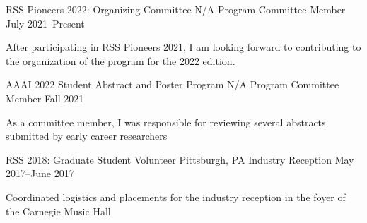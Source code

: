 
\begin{cventries}
  \cventry
  {RSS Pioneers 2022: Organizing Committee}
  {N/A}
  {Program Committee Member}
  {July 2021--Present}
  {
    \begin{cvitems}
    \item After participating in RSS Pioneers 2021, I am looking forward to
      contributing to the organization of the program for the 2022 edition.
    \end{cvitems}
  }
  \cventry
  {AAAI 2022 Student Abstract and Poster Program}
  {N/A}
  {Program Committee Member}
  {Fall 2021}
  {
    \begin{cvitems}
    \item As a committee member, I was responsible for reviewing several
      abstracts submitted by early career researchers
    \end{cvitems}
  }
  \cventry
  {RSS 2018: Graduate Student Volunteer}
  {Pittsburgh, PA}
  {Industry Reception}
  {May 2017--June 2017}
  {
    \begin{cvitems}
    \item Coordinated logistics and placements for the industry reception
      in the foyer of the Carnegie Music Hall
    \end{cvitems}
  }
\end{cventries}
